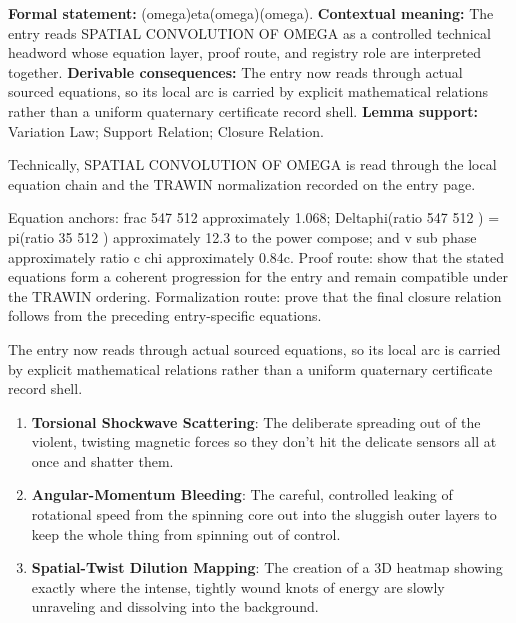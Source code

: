 \begingroup\footnotesize\setlength{\emergencystretch}{3em}\sloppy
\textbf{Formal statement:} (omega)eta(omega)(omega). \textbf{Contextual meaning:} The entry reads SPATIAL CONVOLUTION OF OMEGA as a controlled technical headword whose equation layer, proof route, and registry role are interpreted together. \textbf{Derivable consequences:} The entry now reads through actual sourced equations, so its local arc is carried by explicit mathematical relations rather than a uniform quaternary certificate record shell. \textbf{Lemma support:} Variation Law; Support Relation; Closure Relation.\par
\endgroup

Technically, SPATIAL CONVOLUTION OF OMEGA is read through the local equation chain and the TRAWIN normalization recorded on the entry page.

Equation anchors: frac 547 512 approximately 1.068; Deltaphi(ratio 547 512 ) = pi(ratio 35 512 ) approximately 12.3 to the power compose; and v sub phase approximately ratio c chi approximately 0.84c. Proof route: show that the stated equations form a coherent progression for the entry and remain compatible under the TRAWIN ordering. Formalization route: prove that the final closure relation follows from the preceding entry-specific equations.

The entry now reads through actual sourced equations, so its local arc is carried by explicit mathematical relations rather than a uniform quaternary certificate record shell.
\endgroup

\begin{enumerate}[leftmargin=1.6em,itemsep=6pt,topsep=4pt]
\item \textbf{Torsional Shockwave Scattering}: The deliberate spreading out of the violent, twisting magnetic forces so they don't hit the delicate sensors all at once and shatter them.
\item \textbf{Angular-Momentum Bleeding}: The careful, controlled leaking of rotational speed from the spinning core out into the sluggish outer layers to keep the whole thing from spinning out of control.
\item \textbf{Spatial-Twist Dilution Mapping}: The creation of a 3D heatmap showing exactly where the intense, tightly wound knots of energy are slowly unraveling and dissolving into the background.
\end{enumerate}

